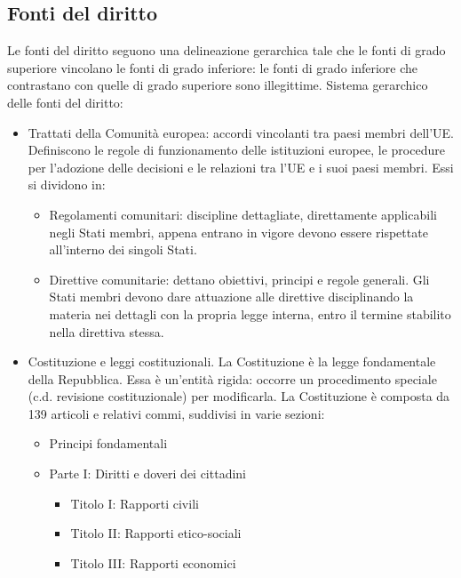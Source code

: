 \subsection{Fonti del diritto}

Le fonti del diritto seguono una delineazione gerarchica tale che le fonti di
grado superiore vincolano le fonti di grado inferiore: le fonti di grado inferiore
che contrastano con quelle di grado superiore sono illegittime.\newline
Sistema gerarchico delle fonti del diritto:
\begin{itemize}
    \item Trattati della Comunità europea: accordi vincolanti tra paesi membri dell'UE. Definiscono
    le regole di funzionamento delle istituzioni europee, le procedure per l'adozione
    delle decisioni e le relazioni tra l'UE e i suoi paesi membri.\newline
    Essi si dividono in:
    \begin{itemize}
        \item Regolamenti comunitari: discipline dettagliate, direttamente applicabili negli Stati 
        membri, appena entrano in vigore devono essere rispettate all'interno dei singoli Stati.
        \item Direttive comunitarie: dettano obiettivi, principi e regole generali. Gli Stati
        membri devono dare attuazione alle direttive disciplinando la materia nei dettagli 
        con la propria legge interna, entro il termine stabilito nella direttiva stessa.
    \end{itemize}
    \item Costituzione e leggi costituzionali.\newline
    La Costituzione è la legge fondamentale della Repubblica. Essa è un'entità rigida: occorre
    un procedimento speciale (c.d. revisione costituzionale) per modificarla.\newline
    La Costituzione è composta da 139 articoli e relativi commi, suddivisi in varie sezioni:
    \begin{itemize}
        \item Principi fondamentali
        \item Parte I: Diritti e doveri dei cittadini
        \begin{itemize}
            \item Titolo I: Rapporti civili
            \item Titolo II: Rapporti etico-sociali
            \item Titolo III: Rapporti economici

\end{itemize}
\end{itemize}
\end{itemize}
